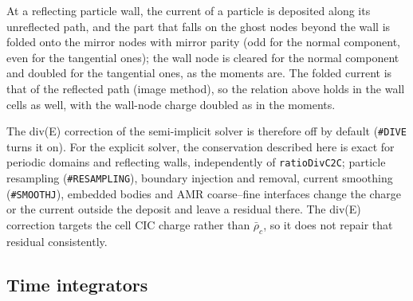 \documentclass[a4paper, 11pt]{article}
\begin{document}
At a reflecting particle wall, the current of a particle is deposited along its unreflected path, and the part that falls on the ghost nodes beyond the wall is folded onto the mirror nodes with mirror parity (odd for the normal component, even for the tangential ones); the wall node is cleared for the normal component and doubled for the tangential ones, as the moments are. The folded current is that of the reflected path (image method), so the relation above holds in the wall cells as well, with the wall-node charge doubled as in the moments.

The div(E) correction of the semi-implicit solver is therefore off by default (\texttt{\#DIVE} turns it on). For the explicit solver, the conservation described here is exact for periodic domains and reflecting walls, independently of \texttt{ratioDivC2C}; particle resampling (\texttt{\#RESAMPLING}), boundary injection and removal, current smoothing (\texttt{\#SMOOTHJ}), embedded bodies and AMR coarse--fine interfaces change the charge or the current outside the deposit and leave a residual there. The div(E) correction targets the cell CIC charge rather than $\bar\rho_c$, so it does not repair that residual consistently.

\subsection{Time integrators}
\end{document}
